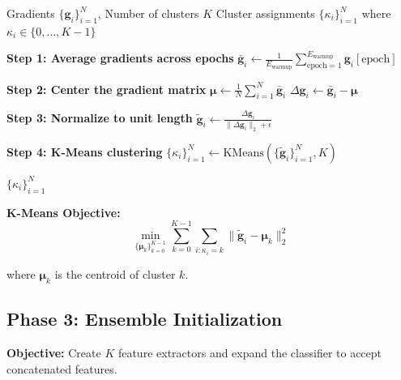 \documentclass[11pt,a4paper]{article}
\begin{document}
\begin{algorithm}
\caption{Client Clustering}
\begin{algorithmic}[1]
\Require Gradients $\{\mathbf{g}_i\}_{i=1}^N$, Number of clusters $K$
\Ensure Cluster assignments $\{\kappa_i\}_{i=1}^N$ where $\kappa_i \in \{0, \ldots, K-1\}$

\State \textbf{Step 1: Average gradients across epochs}
    \State $\bar{\mathbf{g}}_i \gets \frac{1}{E_{\text{warmup}}} \sum_{\text{epoch}=1}^{E_{\text{warmup}}} \mathbf{g}_i[\text{epoch}]$
\EndFor

\State \textbf{Step 2: Center the gradient matrix}
\State $\boldsymbol{\mu} \gets \frac{1}{N} \sum_{i=1}^{N} \bar{\mathbf{g}}_i$ 
    \State $\Delta\mathbf{g}_i \gets \bar{\mathbf{g}}_i - \boldsymbol{\mu}$
\EndFor

\State \textbf{Step 3: Normalize to unit length}
    \State $\tilde{\mathbf{g}}_i \gets \frac{\Delta\mathbf{g}_i}{\|\Delta\mathbf{g}_i\|_2 + \epsilon}$
\EndFor

\State \textbf{Step 4: K-Means clustering}
\State $\{\kappa_i\}_{i=1}^N \gets \text{KMeans}(\{\tilde{\mathbf{g}}_i\}_{i=1}^N, K)$

\State \Return $\{\kappa_i\}_{i=1}^N$
\end{algorithmic}
\end{algorithm}

\textbf{K-Means Objective:}
\begin{equation}
\min_{\{\boldsymbol{\mu}_k\}_{k=0}^{K-1}} \sum_{k=0}^{K-1} \sum_{i: \kappa_i = k} \|\tilde{\mathbf{g}}_i - \boldsymbol{\mu}_k\|_2^2
\end{equation}

where $\boldsymbol{\mu}_k$ is the centroid of cluster $k$.

\subsection{Phase 3: Ensemble Initialization}

\textbf{Objective:} Create $K$ feature extractors and expand the classifier to accept concatenated features.
\end{document}
